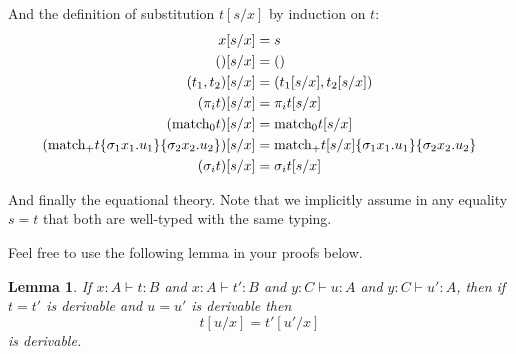 \documentclass[12pt]{article}
\newtheorem{lemma}{Lemma}
\begin{document}
And the definition of substitution $t[s/x]$ by induction on $t$:
\begin{align*}
  x[s/x] &= s\\
  ()[s/x] &= ()\\
  (t_1,t_2)[s/x] &= (t_1[s/x], t_2[s/x])\\
  (\pi_i t)[s/x] &= \pi_i t[s/x]\\
  (\textrm{match}_0 t)[s/x] &= \textrm{match}_0 {t[s/x]}\\
  (\textrm{match}_+ {t}\{{\sigma_1 x_1. u_1}\}\{{\sigma_2 x_2. u_2}\})[s/x]  &= \textrm{match}_+ {t[s/x]}\{{\sigma_1 x_1. u_1}\}\{{\sigma_2 x_2. u_2}\}\\
  (\sigma_i t)[s/x] &= \sigma_i t[s/x]\\
\end{align*}

And finally the equational theory. Note that we implicitly assume in
any equality $s = t$ that both are well-typed with the same typing.

Feel free to use the following lemma in your proofs below.
\begin{lemma}
  If $x:A \vdash t : B$ and $x:A \vdash t' : B$ and $y:C \vdash u : A$ and $y:C \vdash u' : A$,
  then if $t = t'$ is derivable and $u = u'$ is derivable then
  \[ t[u/x] = t'[u'/x] \]
  is derivable.  
\end{lemma}
\end{document}
